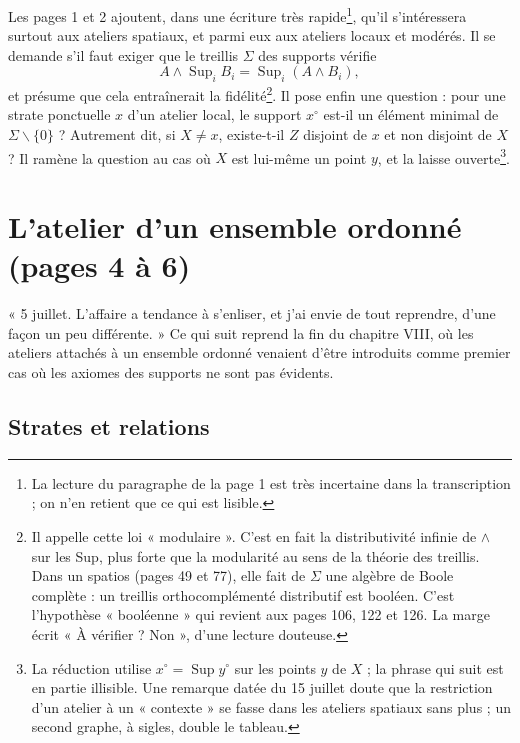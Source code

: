 \documentclass[11pt,a4paper]{article}
\begin{document}
Les pages 1 et 2 ajoutent, dans une écriture très rapide\footnote{La lecture du
paragraphe de la page 1 est très incertaine dans la transcription ; on n'en
retient que ce qui est lisible.}, qu'il s'intéressera surtout aux ateliers
spatiaux, et parmi eux aux ateliers locaux et modérés. Il se demande s'il faut
exiger que le treillis $\Sigma$ des supports vérifie
\[
A \wedge \operatorname{Sup}_{i} B_{i} = \operatorname{Sup}_{i} (A \wedge B_{i}),
\]
et présume que cela entraînerait la fidélité\footnote{Il appelle cette loi
« modulaire ». C'est en fait la distributivité infinie de $\wedge$ sur les Sup,
plus forte que la modularité au sens de la théorie des treillis. Dans un spatios
(pages 49 et 77), elle fait de $\Sigma$ une algèbre de Boole complète : un
treillis orthocomplémenté distributif est booléen. C'est l'hypothèse
« booléenne » qui revient aux pages 106, 122 et 126. La marge écrit « À vérifier ?
Non », d'une lecture douteuse.}. Il pose enfin une question : pour une strate
ponctuelle $x$ d'un atelier local, le support $x^{\circ}$ est-il un élément
minimal de $\Sigma \smallsetminus \{0\}$ ? Autrement dit, si $X \neq x$,
existe-t-il $Z$ disjoint de $x$ et non disjoint de $X$ ? Il ramène la question
au cas où $X$ est lui-même un point $y$, et la laisse ouverte\footnote{La
réduction utilise $x^{\circ} = \operatorname{Sup} y^{\circ}$ sur les points $y$
de $X$ ; la phrase qui suit est en partie illisible. Une remarque datée du 15
juillet doute que la restriction d'un atelier à un « contexte » se fasse dans
les ateliers spatiaux sans plus ; un second graphe, à sigles, double le
tableau.}.

\section*{L'atelier d'un ensemble ordonné (pages 4 à 6)}

« 5 juillet. L'affaire a tendance à s'enliser, et j'ai envie de tout reprendre,
d'une façon un peu différente. » Ce qui suit reprend la fin du chapitre VIII,
où les ateliers attachés à un ensemble ordonné venaient d'être introduits comme
premier cas où les axiomes des supports ne sont pas évidents.

\subsection*{Strates et relations}
\end{document}
